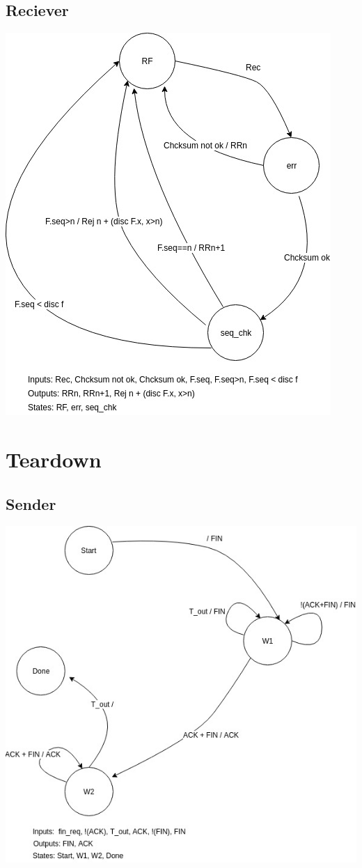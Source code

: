 \documentclass{article}
\begin{document}
\subsection{Reciever}
\includegraphics[scale=0.6]{SW_R.jpg}
\section{Teardown}
\subsection{Sender}
\includegraphics[scale=0.6]{TD_S.jpg}
\end{document}
